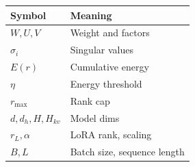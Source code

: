\begin{table}[H]
\centering
\small
\begin{tabular}{ll}
\toprule
\textbf{Symbol} & \textbf{Meaning} \\
\midrule
$W, U, V$ & Weight and factors \\
$\sigma_i$ & Singular values \\
$E(r)$ & Cumulative energy \\
$\eta$ & Energy threshold \\
$r_\text{max}$ & Rank cap \\
$d, d_h, H, H_{kv}$ & Model dims \\
$r_L, \alpha$ & LoRA rank, scaling \\
$B, L$ & Batch size, sequence length \\
\bottomrule
\end{tabular}
\end{table}

